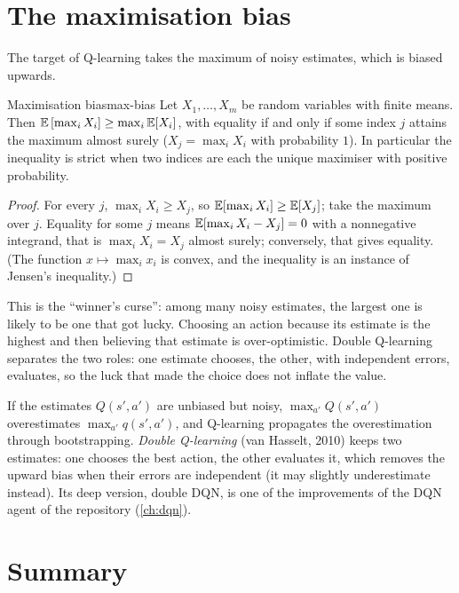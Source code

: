 \section{The maximisation bias}

The target of Q-learning takes the maximum of noisy estimates, which is
biased upwards.

\begin{proposition}{Maximisation bias}{max-bias}
  Let $X_1, \dots, X_m$ be random variables with finite means. Then
  $\mathbb{E}\left[\max_i X_i\right] \geq \max_i \mathbb{E}[X_i]$, with equality if and only
  if some index $j$ attains the maximum almost surely ($X_j = \max_i X_i$
  with probability $1$). In particular the inequality is strict when two
  indices are each the unique maximiser with positive probability.
\end{proposition}

\begin{proof}
  For every $j$, $\max_i X_i \geq X_j$, so $\mathbb{E}[\max_i X_i] \geq \mathbb{E}[X_j]$;
  take the maximum over $j$. Equality for some $j$ means $\mathbb{E}[\max_i X_i -
  X_j] = 0$ with a nonnegative integrand, that is $\max_i X_i = X_j$ almost
  surely; conversely, that gives equality. (The function $x \mapsto
  \max_i x_i$ is convex, and the inequality is an instance of Jensen's
  inequality.)
\end{proof}

\begin{intuition}
  This is the ``winner's curse'': among many noisy estimates, the largest
  one is likely to be one that got lucky. Choosing an action because its
  estimate is the highest and then believing that estimate is
  over-optimistic. Double Q-learning separates the two roles: one estimate
  chooses, the other, with independent errors, evaluates, so the luck that
  made the choice does not inflate the value.
\end{intuition}

If the estimates $Q(s', a')$ are unbiased but noisy, $\max_{a'} Q(s', a')$
overestimates $\max_{a'} q(s', a')$, and Q-learning propagates the
overestimation through bootstrapping. \emph{Double Q-learning} (van
Hasselt, 2010) keeps two estimates: one chooses the best action, the
other evaluates it, which removes the upward bias when their errors are
independent (it may slightly underestimate instead). Its deep version,
double DQN, is one of the improvements of the DQN agent of the repository
(\cref{ch:dqn}).

\section{Summary}

